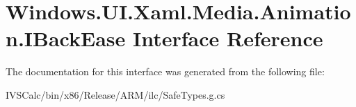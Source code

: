 \hypertarget{interface_windows_1_1_u_i_1_1_xaml_1_1_media_1_1_animation_1_1_i_back_ease}{}\section{Windows.\+U\+I.\+Xaml.\+Media.\+Animation.\+I\+Back\+Ease Interface Reference}
\label{interface_windows_1_1_u_i_1_1_xaml_1_1_media_1_1_animation_1_1_i_back_ease}


The documentation for this interface was generated from the following file\+:\begin{DoxyCompactItemize}
\item 
I\+V\+S\+Calc/bin/x86/\+Release/\+A\+R\+M/ilc/Safe\+Types.\+g.\+cs\end{DoxyCompactItemize}
